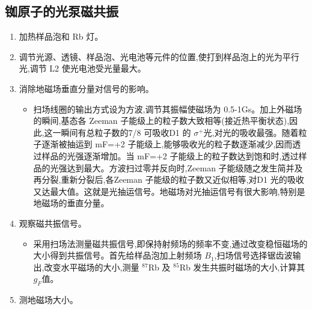\documentclass[12pt, a4paper]{article}
\begin{document}
\subsection{铷原子的光泵磁共振}
\begin{enumerate}
    \item 加热样品泡和 Rb 灯。
    \item 调节光源、透镜、样品泡、光电池等元件的位置,使打到样品泡上的光为平行光,调节 L2 使光电池受光量最大。
    \item 消除地磁场垂直分量对信号的影响。
    \begin{itemize}
    \item 扫场线圈的输出方式设为方波,调节其振幅使磁场为 0.5-1Gs。加上外磁场的瞬间,基态各 Zeeman 子能级上的粒子数大致相等(接近热平衡状态),因此,这一瞬间有总粒子数的7/8 可吸收D1 的 $\sigma^+$光,对光的吸收最强。随着粒子逐渐被抽运到 mF=+2 子能级上,能够吸收光的粒子数逐渐减少,因而透过样品的光强逐渐增加。当 mF=+2 子能级上的粒子数达到饱和时,透过样品的光强达到最大。方波扫过零并反向时,Zeeman 子能级随之发生简并及再分裂,重新分裂后,各Zeeman 子能级的粒子数又近似相等,对D1 光的吸收又达最大值。这就是光抽运信号。地磁场对光抽运信号有很大影响,特别是地磁场的垂直分量。
    \end{itemize}
    
    \item 观察磁共振信号。
    \begin{itemize}
    \item 采用扫场法测量磁共振信号,即保持射频场的频率不变,通过改变稳恒磁场的大小得到共振信号。首先给样品泡加上射频场 $B_1$,扫场信号选择锯齿波输出,改变水平磁场的大小,测量 $^{87}$Rb 及 $^{85}$Rb 发生共振时磁场的大小,计算其$g_F$值。
    \end{itemize}

    \item 测地磁场大小。
\end{enumerate}
\end{document}
